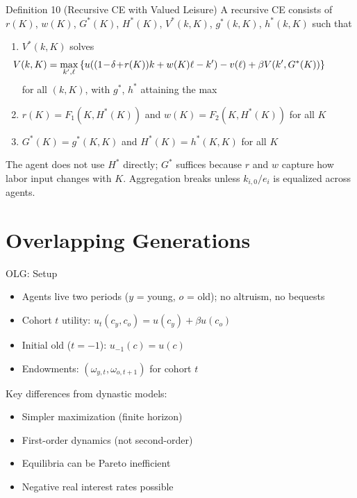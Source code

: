 \documentclass[blue]{beamer}
\begin{document}
\begin{frame}{Definition 10 (Recursive CE with Valued Leisure)}
	\small
	A recursive CE consists of $r(K)$, $w(K)$, $G^*(K)$, $H^*(K)$, $V^*(k,K)$, $g^*(k,K)$, $h^*(k,K)$ such that
	
	\begin{enumerate}
		\item $V^*(k,K)$ solves
		\[
		\hspace{-40pt} V(k,K) = \max_{k', \ell} \left\{ u((1\!-\!\delta\!+\!r(K))k + w(K)\ell - k') - v(\ell) + \beta V(k', G^*(K)) \right\}
		\]
		for all $(k,K)$, with $g^*$, $h^*$ attaining the max
		
		\item $r(K) = F_1(K, H^*(K))$ and $w(K) = F_2(K, H^*(K))$ for all $K$
		
		\item $G^*(K) = g^*(K,K)$ and $H^*(K) = h^*(K,K)$ for all $K$
	\end{enumerate}
	
	\normalsize
	\medskip
	The agent does not use $H^*$ directly; $G^*$ suffices because $r$ and $w$ capture how labor input changes with $K$. Aggregation breaks unless $k_{i,0}/e_i$ is equalized across agents.
\end{frame}

\section{Overlapping Generations}

\begin{frame}{OLG: Setup}
	\begin{itemize}
		\item Agents live two periods ($y$ = young, $o$ = old); no altruism, no bequests
		\item Cohort $t$ utility: $u_t(c_y, c_o) = u(c_y) + \beta u(c_o)$
		\item Initial old ($t = -1$): $u_{-1}(c) = u(c)$
		\item Endowments: $(\omega_{y,t}, \omega_{o,t+1})$ for cohort $t$
	\end{itemize}
	
	\bigskip
	Key differences from dynastic models:
	\begin{itemize}
		\item Simpler maximization (finite horizon)
		\item First-order dynamics (not second-order)
		\item Equilibria can be Pareto inefficient
		\item Negative real interest rates possible
	\end{itemize}
\end{frame}
\end{document}
